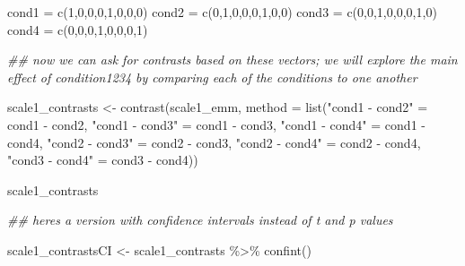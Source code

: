 \documentclass[
  letterpaper,
  DIV=11,
  numbers=noendperiod]{scrreprt}
\newenvironment{Shaded}{\begin{snugshade}}{\end{snugshade}}
\newcommand{\AttributeTok}[1]{\textcolor[rgb]{0.40,0.45,0.13}{#1}}
\newcommand{\DecValTok}[1]{\textcolor[rgb]{0.68,0.00,0.00}{#1}}
\newcommand{\DocumentationTok}[1]{\textcolor[rgb]{0.37,0.37,0.37}{\textit{#1}}}
\newcommand{\FunctionTok}[1]{\textcolor[rgb]{0.28,0.35,0.67}{#1}}
\newcommand{\NormalTok}[1]{\textcolor[rgb]{0.00,0.23,0.31}{#1}}
\newcommand{\OtherTok}[1]{\textcolor[rgb]{0.00,0.23,0.31}{#1}}
\newcommand{\SpecialCharTok}[1]{\textcolor[rgb]{0.37,0.37,0.37}{#1}}
\newcommand{\StringTok}[1]{\textcolor[rgb]{0.13,0.47,0.30}{#1}}
\begin{document}
\begin{Shaded}
\begin{Highlighting}[]
\NormalTok{cond1 }\OtherTok{=} \FunctionTok{c}\NormalTok{(}\DecValTok{1}\NormalTok{,}\DecValTok{0}\NormalTok{,}\DecValTok{0}\NormalTok{,}\DecValTok{0}\NormalTok{,}\DecValTok{1}\NormalTok{,}\DecValTok{0}\NormalTok{,}\DecValTok{0}\NormalTok{,}\DecValTok{0}\NormalTok{)}
\NormalTok{cond2 }\OtherTok{=} \FunctionTok{c}\NormalTok{(}\DecValTok{0}\NormalTok{,}\DecValTok{1}\NormalTok{,}\DecValTok{0}\NormalTok{,}\DecValTok{0}\NormalTok{,}\DecValTok{0}\NormalTok{,}\DecValTok{1}\NormalTok{,}\DecValTok{0}\NormalTok{,}\DecValTok{0}\NormalTok{)}
\NormalTok{cond3 }\OtherTok{=} \FunctionTok{c}\NormalTok{(}\DecValTok{0}\NormalTok{,}\DecValTok{0}\NormalTok{,}\DecValTok{1}\NormalTok{,}\DecValTok{0}\NormalTok{,}\DecValTok{0}\NormalTok{,}\DecValTok{0}\NormalTok{,}\DecValTok{1}\NormalTok{,}\DecValTok{0}\NormalTok{)}
\NormalTok{cond4 }\OtherTok{=} \FunctionTok{c}\NormalTok{(}\DecValTok{0}\NormalTok{,}\DecValTok{0}\NormalTok{,}\DecValTok{0}\NormalTok{,}\DecValTok{1}\NormalTok{,}\DecValTok{0}\NormalTok{,}\DecValTok{0}\NormalTok{,}\DecValTok{0}\NormalTok{,}\DecValTok{1}\NormalTok{)}


\DocumentationTok{\#\# now we can ask for contrasts based on these vectors; we will explore the main effect of condition1234 by comparing each of the conditions to one another}

\NormalTok{scale1\_contrasts }\OtherTok{\textless{}{-}} \FunctionTok{contrast}\NormalTok{(scale1\_emm, }\AttributeTok{method =} \FunctionTok{list}\NormalTok{(}\StringTok{"cond1 {-} cond2"} \OtherTok{=}\NormalTok{ cond1 }\SpecialCharTok{{-}}\NormalTok{ cond2,}
                                       \StringTok{"cond1 {-} cond3"} \OtherTok{=}\NormalTok{ cond1 }\SpecialCharTok{{-}}\NormalTok{ cond3,}
                                       \StringTok{"cond1 {-} cond4"} \OtherTok{=}\NormalTok{ cond1 }\SpecialCharTok{{-}}\NormalTok{ cond4,}
                                       \StringTok{"cond2 {-} cond3"} \OtherTok{=}\NormalTok{ cond2 }\SpecialCharTok{{-}}\NormalTok{ cond3,}
                                       \StringTok{"cond2 {-} cond4"} \OtherTok{=}\NormalTok{ cond2 }\SpecialCharTok{{-}}\NormalTok{ cond4,}
                                       \StringTok{"cond3 {-} cond4"} \OtherTok{=}\NormalTok{ cond3 }\SpecialCharTok{{-}}\NormalTok{ cond4)) }
  

\NormalTok{scale1\_contrasts}

\DocumentationTok{\#\# here\textquotesingle{}s a version with confidence intervals instead of t and p values}

\NormalTok{scale1\_contrastsCI }\OtherTok{\textless{}{-}}\NormalTok{ scale1\_contrasts }\SpecialCharTok{\%\textgreater{}\%}
                          \FunctionTok{confint}\NormalTok{()}


\end{Highlighting}
\end{Shaded}
\end{document}
